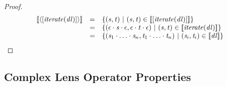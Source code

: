 \documentclass[numbers,10pt,preprint\ifanon ,nocopyrightspace\fi]{sigplanconf}
\begin{document}
\begin{proof}
  \[
    \begin{array}{rcl}
      \SemanticsOf{\DNFLensOf{\SequenceLensOf{\IterateLensOf{\DNFLens}}}}
      & = &
            \SetOf{
            (\String,\StringAlt)
            \SuchThat
            (\String,\StringAlt)\in\SemanticsOf{\SequenceLensOf{\IterateLensOf{\DNFLens}}}}\\
      & = &
            \SetOf{
            (\EmptyString\Concat\String\Concat\EmptyString,\EmptyString\Concat\StringAlt\Concat\EmptyString)
            \SuchThat
            (\String,\StringAlt)\in\SemanticsOf{\IterateLensOf{\DNFLens}}}\\
      & = &
            \SetOf{
            (\String_1\Concat\ldots\Concat\String_n,\StringAlt_1\Concat\ldots\Concat\StringAlt_n)
            \SuchThat
            (\String_i,\StringAlt_i)\in\SemanticsOf{\DNFLens}}
    \end{array}
  \]
\end{proof}

\subsection{Complex Lens Operator Properties}
\end{document}
